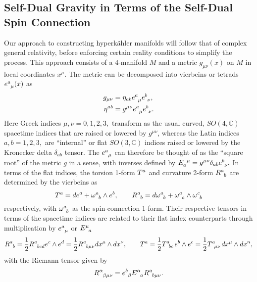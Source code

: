 \documentclass[a4paper,12pt, onecolumn, notitlepage]{article}
\theoremstyle{definition}
\theoremstyle{remark}
\newcommand{\al}{\alpha}
\newcommand{\w}{\omega}
\newcommand{\m}{\mu}
\newcommand{\n}{\nu}
\newcommand{\HK}{hyperk\"ahler }
\begin{document}
\subsection{Self-Dual Gravity in Terms of the Self-Dual Spin Connection}
Our approach to constructing \HK manifolds will follow that of complex general relativity, before enforcing certain reality conditions to simplify the process. This approach consists of a 4-manifold $M$ and a metric $g_{\m\n}(x)$ on $M$ in local coordinates $x^{\m}.$ The metric can be decomposed into vierbeins or tetrads $e\indices{^a_\m}(x)$ as
\begin{align*}
	g_{\m\n} &= \eta_{ab}e\indices{^a_\m}e\indices{^b_\n},\\
	\eta^{ab} &= g^{\m\n}e\indices{^a_\m}e\indices{^b_\n}.
\end{align*}
Here Greek indices $\m,\n=0,1,2,3,$ transform as the usual curved, $SO(4,\mathbb{C})$ spacetime indices that  are raised or lowered by $g^{\m\n}$, whereas the Latin indices $a,b=1,2,3,$ are ``internal'' or flat $SO(3,\mathbb{C})$ indices raised or lowered by the Kronecker delta $\delta_{ab}$ tensor. The $e\indices{^a_\m}$ can therefore be thought of as the ``square root'' of the metric $g$ in a sense, with inverses defined by $E\indices{_a^{\m}} = g^{\m\n}\delta_{ab}e\indices{^b_\n}.$ In terms of the flat indices, the torsion 1-form $T\indices{^a}$ and curvature 2-form $R\indices{^a_b}$ are determined by the vierbeins as
\begin{equation*}
	T\indices{^a} = de\indices{^a} + \w\indices{^a_b}\wedge e\indices{^b},\qquad R\indices{^a_b} = d\w\indices{^a_b} + \w\indices{^a_c}\wedge\w\indices{^c_b}
\end{equation*}
respectively, with $\w\indices{^a_b}$ as the spin-connection 1-form. Their respective tensors in terms of the spacetime indices are related to their flat index counterparts through multiplication by $e\indices{^a_\m}$ or $E\indices{^\m_a}$
\begin{equation*}
R\indices{^a_b}=\frac{1}{2}R\indices{^a_b_c_d}e\indices{^c}\wedge e\indices{^d}=\frac{1}{2}R\indices{^a_b_\m_\n}dx\indices{^\m}\wedge dx\indices{^\n},\qquad T\indices{^a} = \frac{1}{2}T\indices{^a_b_c}e\indices{^b}\wedge e\indices{^c}=\frac{1}{2}T\indices{^a_\m_\n}dx\indices{^\m}\wedge dx\indices{^n},
\end{equation*}
with the Riemann tensor given by
\begin{equation*}
	\label{riemann}
	R\indices{^\al_\beta_\mu_\n} = e\indices{^b_\beta}E\indices{^\al_a}R\indices{^a_b_\m_\n}.
\end{equation*}
\end{document}
